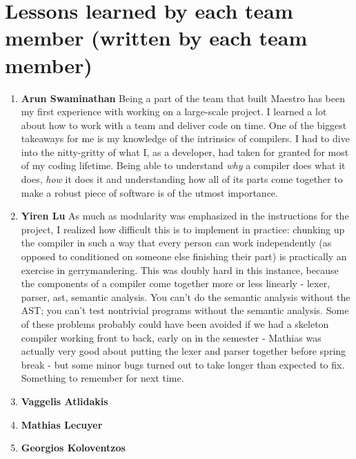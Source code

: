 \section{Lessons learned by each team member (written by each team member)}
\begin{enumerate}
\item \textbf{Arun Swaminathan} \newline
Being a part of the team that built Maestro has been my first experience with working on a large-scale project. I learned a lot about how to work with a team and deliver code on time.
One of the biggest takeaways for me is my knowledge of the intrinsics of compilers. I had to dive into the nitty-gritty of what I, as a developer, had taken for granted for most of my coding lifetime. Being able to understand \textit{why} a compiler does what it does, \textit{how} it does it and understanding how all of its parts come together to make a robust piece of software is of the utmost importance.
\item \textbf{Yiren Lu} \newline
As much as modularity was emphasized in the instructions for the project, I realized how difficult this is to implement in practice: chunking up the compiler in such a way that every person can work independently (as opposed to conditioned on someone else finishing their part) is practically an exercise in gerrymandering. This was doubly hard in this instance, because the components of a compiler come together more or less linearly - lexer, parser, ast, semantic analysis. You can't do the semantic analysis without the AST; you can't test nontrivial programs without the semantic analysis. Some of these problems probably could have been avoided if we had a skeleton compiler working front to back, early on in the semester - Mathias was actually very good about putting the lexer and parser together before spring break - but some minor bugs turned out to take longer than expected to fix. Something to remember for next time.

\item \textbf{Vaggelis Atlidakis}

\item \textbf{Mathias Lecuyer}

\item \textbf{Georgios Koloventzos}

\end{enumerate}
